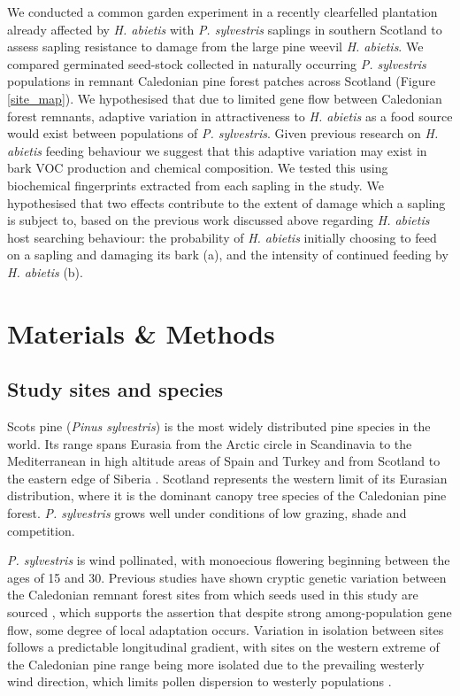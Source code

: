 \documentclass[a4paper, 11pt]{article}
\begin{document}
We conducted a common garden experiment in a recently clearfelled plantation already affected by \textit{H. abietis} with \textit{P. sylvestris} saplings in southern Scotland to assess sapling resistance to damage from the large pine weevil \textit{H. abietis}. We compared germinated seed-stock collected in naturally occurring \textit{P. sylvestris} populations in remnant Caledonian pine forest patches across Scotland (Figure \ref{site_map}). We hypothesised that due to limited gene flow between Caledonian forest remnants, adaptive variation in attractiveness to \textit{H. abietis} as a food source would exist between populations of \textit{P. sylvestris}. Given previous research on \textit{H. abietis} feeding behaviour we suggest that this adaptive variation may exist in bark VOC production and chemical composition. We tested this using biochemical fingerprints extracted from each sapling in the study. We hypothesised that two effects contribute to the extent of damage which a sapling is subject to, based on the previous work discussed above regarding \textit{H. abietis} host searching behaviour: the probability of \textit{H. abietis} initially choosing to feed on a sapling and damaging its bark (a), and the intensity of continued feeding by \textit{H. abietis} (b). 

\section*{Materials \& Methods}

\subsection*{Study sites and species}

Scots pine (\textit{Pinus sylvestris}) is the most widely distributed pine species in the world. Its range spans Eurasia from the Arctic circle in Scandinavia to the Mediterranean in high altitude areas of Spain and Turkey and from Scotland to the eastern edge of Siberia \citep{GBIF2019, Carlisle1968}. Scotland represents the western limit of its Eurasian distribution, where it is the dominant canopy tree species of the Caledonian pine forest. \textit{P. sylvestris} grows well under conditions of low grazing, shade and competition. 

\textit{P. sylvestris} is wind pollinated, with monoecious flowering beginning between the ages of 15 and 30. Previous studies have shown cryptic genetic variation between the Caledonian remnant forest sites from which seeds used in this study are sourced \citep{Donnelly2018}, which supports the assertion that despite strong among-population gene flow, some degree of local adaptation occurs. Variation in isolation between sites follows a predictable longitudinal gradient, with sites on the western extreme of the Caledonian pine range being more isolated due to the prevailing westerly wind direction, which limits pollen dispersion to westerly populations \citep{Gonzalez2018}. 
\end{document}
